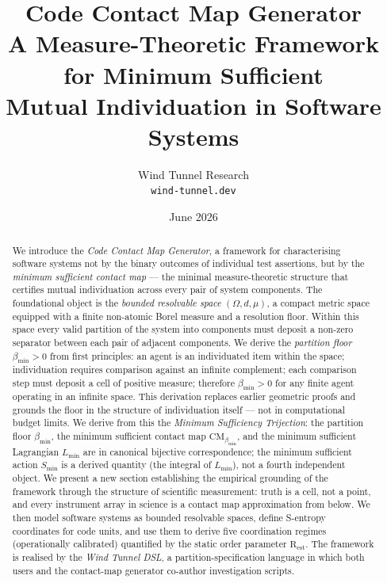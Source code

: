 \documentclass[12pt,a4paper,twocolumn]{article}
\title{\textbf{Code Contact Map Generator}\\[4pt]
  {\large A Measure-Theoretic Framework for Minimum Sufficient\\
  Mutual Individuation in Software Systems}}
\author{Wind Tunnel Research\\[4pt]
  \small \texttt{wind-tunnel.dev}}
\date{June 2026}
\theoremstyle{plain}
\theoremstyle{definition}
\theoremstyle{remark}
\newcommand{\CM}{\mathrm{CM}}
\newcommand{\bmin}{\beta_{\min}}
\newcommand{\Rest}{\mathrm{R}_{\mathrm{est}}}
\newcommand{\Lmin}{L_{\min}}
\newcommand{\Smin}{S_{\min}}
\newcommand{\CMbmin}{\CM_{\bmin}}
\newcommand{\BRS}{(\Omega,d,\mu)}
\begin{document}

\maketitle

\begin{abstract}
We introduce the \emph{Code Contact Map Generator}, a framework for
characterising software systems not by the binary outcomes of individual test
assertions, but by the \emph{minimum sufficient contact map} --- the minimal
measure-theoretic structure that certifies mutual individuation across every
pair of system components.  The foundational object is the \emph{bounded
resolvable space} $\BRS$, a compact metric space equipped with a finite
non-atomic Borel measure and a resolution floor.  Within this space every
valid partition of the system into components must deposit a non-zero
separator between each pair of adjacent components.  We derive the
\emph{partition floor} $\bmin > 0$ from first principles: an agent is an
individuated item within the space; individuation requires comparison against
an infinite complement; each comparison step must deposit a cell of
positive measure; therefore $\bmin > 0$ for any finite agent operating in
an infinite space.  This derivation replaces earlier geometric proofs and
grounds the floor in the structure of individuation itself --- not in
computational budget limits.  We derive from this the \emph{Minimum
Sufficiency Trijection}: the partition floor $\bmin$, the minimum sufficient
contact map $\CMbmin$, and the minimum sufficient Lagrangian $\Lmin$ are in
canonical bijective correspondence; the minimum sufficient action $\Smin$ is
a derived quantity (the integral of $\Lmin$), not a fourth independent
object.  We present a new section establishing the empirical grounding of
the framework through the structure of scientific measurement: truth is a
cell, not a point, and every instrument array in science is a contact map
approximation from below.  We then model software systems as bounded
resolvable spaces, define S-entropy coordinates for code units, and use them
to derive five coordination regimes (operationally calibrated) quantified by
the static order parameter $\Rest$.  The framework is realised by the
\emph{Wind Tunnel DSL}, a partition-specification language in which both
users and the contact-map generator co-author investigation scripts.
\end{abstract}
\end{document}
